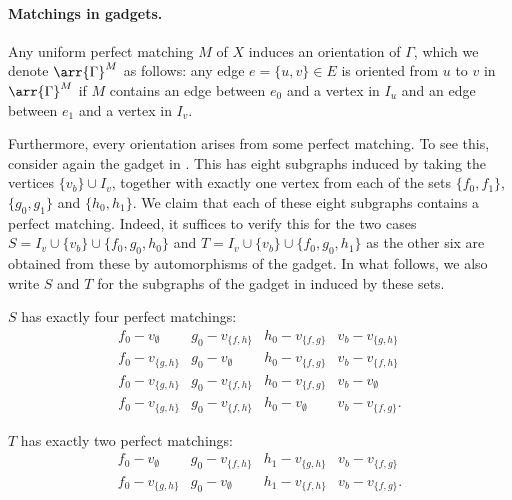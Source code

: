 \documentclass{toc}
\begin{document}
\paragraph{Matchings in gadgets.}
Any uniform perfect matching $M$ of $X$ induces an orientation of $\Gamma$, which we
denote $\arr{\Gamma}^M$ as follows: any edge $e=\{u,v\} \in E$ is oriented from $u$
to $v$ in $\arr{\Gamma}^M$ if $M$ contains an edge between $e_0$ and a vertex in
$I_u$ and an edge between $e_1$ and a vertex in $I_v$.

Furthermore, every orientation arises from some perfect matching. To see this,
consider again the gadget in . This has eight subgraphs
induced by taking the vertices $\{v_b\} \cup I_v$, together with exactly one
vertex from each of the sets $\{f_0,f_1\}$, $\{g_0,g_1\}$ and $\{h_0,h_1\}$. We
claim that each of these eight subgraphs contains a perfect matching. Indeed, it
suffices to verify this for the two cases $S = I_v \cup \{v_b\} \cup
\{f_0,g_0,h_0\}$ and $T = I_v \cup \{v_b\} \cup \{f_0,g_0,h_1\}$ as the other
six are obtained from these by automorphisms of the gadget. In what follows, we
also write $S$ and $T$ for the subgraphs of the gadget in
 induced by these sets.

$S$ has exactly four perfect matchings:
$$
\begin{array}{cccc}
  f_0 - v_{\emptyset} & g_0 - v_{\{f,h\}} & h_0 - v_{\{f,g\}} & v_b - v_{\{g,h\}} \\
  f_0 - v_{\{g,h\}}  & g_0 -  v_{\emptyset}  & h_0 - v_{\{f,g\}}  & v_b - v_{\{f,h\}}  \\
  f_0 - v_{\{g,h\}}  & g_0 - v_{\{f,h\}}  & h_0 - v_{\{f,g\}}  & v_b - v_{\emptyset}\\
  f_0 - v_{\{g,h\}}  & g_0 - v_{\{f,h\}}  & h_0 - v_{\emptyset}  & v_b - v_{\{f,g\}}.
\end{array}
$$

$T$ has exactly two perfect matchings:
$$
\begin{array}{cccc}
  f_0 - v_{\emptyset} & g_0 - v_{\{f,h\}} &  h_1 - v_{\{g,h\}}  & v_b - v_{\{f,g\}}  \\
  f_0 - v_{\{g,h\}}  & g_0 -  v_{\emptyset}   & h_1 - v_{\{f,h\}}  & v_b -  v_{\{f,g\}}. 
\end{array}
$$
\end{document}
